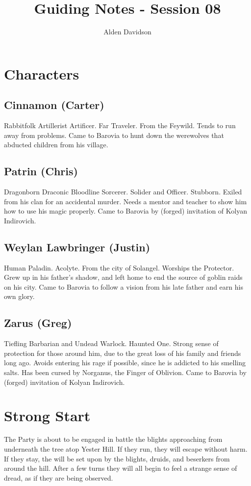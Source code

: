 \documentclass[a4paper,11pt]{article}
\title{Guiding Notes - Session 08}
\author{Alden Davidson}
\begin{document}
\maketitle
\tableofcontents

\pagebreak
\section{Characters}
\label{sec:Characters}
\subsection{Cinnamon (Carter)}
  Rabbitfolk Artillerist Artificer. Far Traveler. From the Feywild. Tends to run away from problems. Came to
  Barovia to hunt down the werewolves that abducted children from his village.
\subsection{Patrin (Chris)}
  Dragonborn Draconic Bloodline Sorcerer. Solider and Officer. Stubborn. Exiled from his clan for an accidental 
  murder. Needs a mentor and teacher to show him how to use his magic properly. Came to Barovia by (forged)
  invitation of Kolyan Indirovich.
\subsection{Weylan Lawbringer (Justin)}
  Human Paladin. Acolyte. From the city of Solangel. Worships the Protector. Grew up in his father's shadow, and 
  left home to end the source of goblin raids on his city. Came to Barovia to follow a vision from his late 
  father and earn his own glory.
\subsection{Zarus (Greg)}
  Tiefling Barbarian and Undead Warlock. Haunted One. Strong sense of protection for those around him, due to the
  great loss of his family and friends long ago. Avoids entering his rage if possible, since he is addicted to 
  his smelling salts. Has been cursed by Norganus, the Finger of Oblivion. Came to Barovia by (forged) 
  invitation of Kolyan Indirovich.


\pagebreak
\section{Strong Start}
\label{sec:StrongStart}
The Party is about to be engaged in battle the blights approaching from underneath the tree atop Yester Hill. 
If they run, they will escape without harm. If they stay, the will be set upon by the blights, druids, and 
beserkers from around the hill. After a few turns they will all begin to feel a strange sense of dread, as if
they are being observed.
\end{document}
